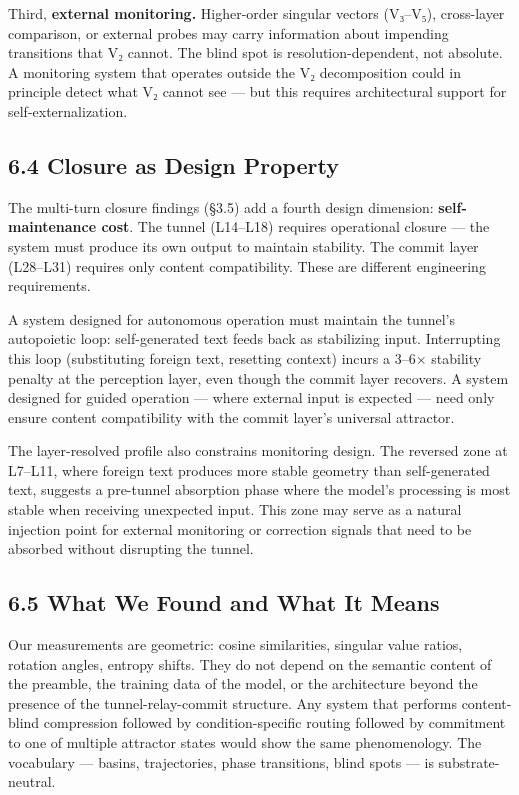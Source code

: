 \documentclass[12pt]{article}
\begin{document}
Third, \textbf{external monitoring.} Higher-order singular vectors (V₃–V₅), cross-layer comparison, or external probes may carry information about impending transitions that V₂ cannot. The blind spot is resolution-dependent, not absolute. A monitoring system that operates outside the V₂ decomposition could in principle detect what V₂ cannot see — but this requires architectural support for self-externalization.

\subsection*{6.4 Closure as Design Property}

The multi-turn closure findings (§3.5) add a fourth design dimension: \textbf{self-maintenance cost}. The tunnel (L14–L18) requires operational closure — the system must produce its own output to maintain stability. The commit layer (L28–L31) requires only content compatibility. These are different engineering requirements.

A system designed for autonomous operation must maintain the tunnel's autopoietic loop: self-generated text feeds back as stabilizing input. Interrupting this loop (substituting foreign text, resetting context) incurs a 3–6× stability penalty at the perception layer, even though the commit layer recovers. A system designed for guided operation — where external input is expected — need only ensure content compatibility with the commit layer's universal attractor.

The layer-resolved profile also constrains monitoring design. The reversed zone at L7–L11, where foreign text produces more stable geometry than self-generated text, suggests a pre-tunnel absorption phase where the model's processing is most stable when receiving unexpected input. This zone may serve as a natural injection point for external monitoring or correction signals that need to be absorbed without disrupting the tunnel.

\subsection*{6.5 What We Found and What It Means}

Our measurements are geometric: cosine similarities, singular value ratios, rotation angles, entropy shifts. They do not depend on the semantic content of the preamble, the training data of the model, or the architecture beyond the presence of the tunnel-relay-commit structure. Any system that performs content-blind compression followed by condition-specific routing followed by commitment to one of multiple attractor states would show the same phenomenology. The vocabulary — basins, trajectories, phase transitions, blind spots — is substrate-neutral.
\end{document}
